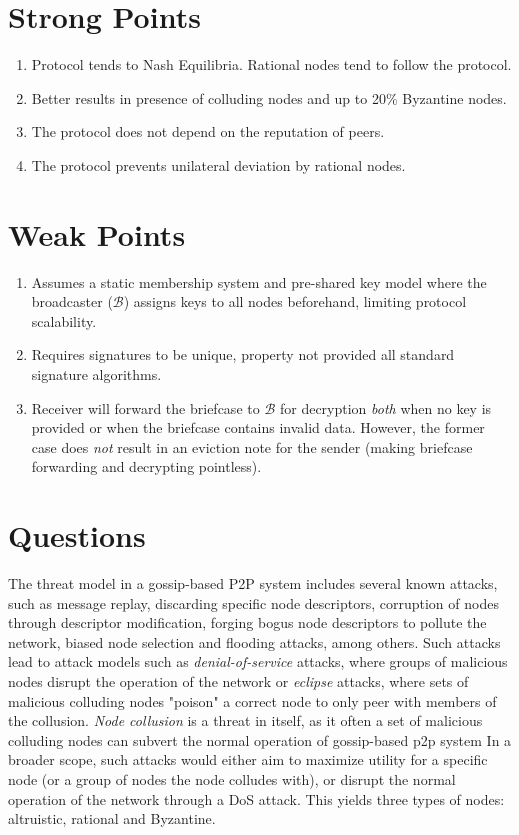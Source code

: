 \documentclass[10pt]{proc}
\begin{document}
\section{Strong Points}
\begin{enumerate}
\item Protocol tends to Nash Equilibria. Rational nodes tend to follow the protocol.
\item Better results in presence of colluding nodes and up to 20\% Byzantine nodes.
\item The protocol does not depend on the reputation of peers.
\item The protocol prevents unilateral deviation by rational nodes.
\end{enumerate}

\section{Weak Points}
\begin{enumerate}
\item Assumes a static membership system and pre-shared key model where the broadcaster ($\mathcal{B}$) assigns keys to all nodes beforehand, limiting protocol scalability.
\item Requires signatures to be unique, property not provided all standard signature algorithms.
\item Receiver will forward the briefcase to $\mathcal{B}$ for decryption \emph{both} when no key is provided or when the briefcase contains invalid data. However, the former case does \emph{not} result in an eviction note for the sender (making briefcase forwarding and decrypting pointless).
\end{enumerate}


\section{Questions}
The threat model in a gossip-based P2P system includes several known attacks, such as
message replay, discarding specific node descriptors, corruption of nodes through descriptor modification, forging bogus node descriptors to pollute the network, biased node selection and flooding attacks, among others. Such attacks lead to attack models such as \emph{denial-of-service} attacks, where groups of malicious nodes disrupt the operation of the network or \emph{eclipse} attacks, where sets of malicious colluding nodes "poison" a correct node to only
peer with members of the collusion. 
\emph{Node collusion} is a threat in itself, as it often
a set of malicious colluding nodes can subvert the normal operation of gossip-based p2p system
In a broader scope, such attacks would either aim to maximize utility for a specific node (or a group of nodes the node colludes with), or disrupt the normal operation of the network through a DoS attack. 
This yields three types of nodes: altruistic, rational and Byzantine.
\end{document}
